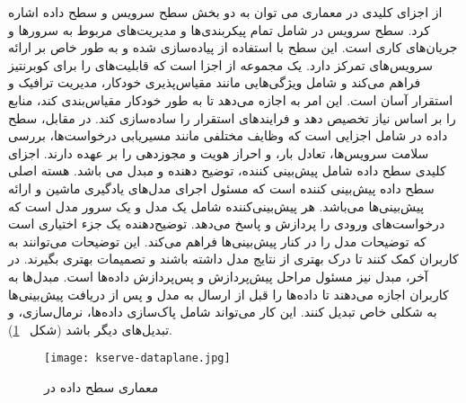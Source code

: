 از اجزای کلیدی در معماری  می توان به دو بخش سطح سرویس و سطح داده اشاره کرد. سطح سرویس در  شامل تمام پیکربندی‌ها و مدیریت‌های مربوط به سرورها و جریان‌های کاری است. این سطح با استفاده از  پیاده‌سازی شده و به طور خاص بر ارائه سرویس‌های  تمرکز دارد.  یک مجموعه از اجزا است که قابلیت‌های  را برای کوبرنتیز فراهم می‌کند و شامل ویژگی‌هایی مانند مقیاس‌پذیری خودکار، مدیریت ترافیک و استقرار آسان است. این امر به  اجازه می‌دهد تا به طور خودکار مقیاس‌بندی کند، منابع را بر اساس نیاز تخصیص دهد و فرایندهای استقرار را ساده‌سازی کند. در مقابل،‌ سطح داده در   شامل اجزایی است که وظایف مختلفی مانند مسیریابی درخواست‌ها، بررسی سلامت سرویس‌ها، تعادل بار، و احراز هویت و مجوزدهی را بر عهده دارند. اجزای کلیدی سطح داده شامل پیش‌بینی کننده،‌ توضیح دهنده و مبدل می باشد. هسته اصلی سطح داده پیش‌بینی کننده است که مسئول اجرای مدل‌های یادگیری ماشین و ارائه پیش‌بینی‌ها می‌باشد. هر پیش‌بینی‌کننده شامل یک مدل و یک سرور مدل است که درخواست‌های ورودی را پردازش و پاسخ می‌دهد. توضیح‌دهنده یک جزء اختیاری است که توضیحات مدل را در کنار پیش‌بینی‌ها فراهم می‌کند. این توضیحات می‌توانند به کاربران کمک کنند تا درک بهتری از نتایج مدل داشته باشند و تصمیمات بهتری بگیرند. در آخر،‌ مبدل نیز مسئول مراحل پیش‌پردازش و پس‌پردازش داده‌ها است. مبدل‌ها به کاربران اجازه می‌دهند تا داده‌ها را قبل از ارسال به مدل و پس از دریافت پیش‌بینی‌ها به شکلی خاص تبدیل کنند. این کار می‌تواند شامل پاک‌سازی داده‌ها، نرمال‌سازی، و تبدیل‌های دیگر باشد \cite{KServe} (شکل ~\ref{fig: kserve dataplane}). 

\begin{figure}[!t]
	\centering
	\texttt{[image: kserve-dataplane.jpg]}
	\caption{معماری سطح داده در }
	\label{fig: kserve dataplane}
\end{figure} 












